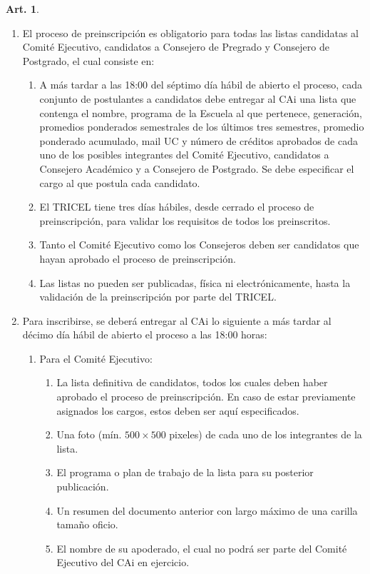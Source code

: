 \documentclass[letterpaper,11pt]{article}
\theoremstyle{definition}%
\newtheorem{art}{Art.} %
\begin{document}
\begin{art}
\begin{enumerate}
		\item El proceso de preinscripción es obligatorio para todas las listas candidatas al Comité Ejecutivo, candidatos a Consejero de Pregrado y Consejero de Postgrado, el cual consiste en:
		      \begin{enumerate}
			      \item A más tardar a las 18:00 del séptimo día hábil de abierto el proceso, cada conjunto
			            de postulantes a candidatos debe entregar al CAi una lista que contenga el nombre, programa de la Escuela al que pertenece, generación, promedios ponderados semestrales de los últimos tres semestres, promedio ponderado acumulado, mail UC y número de créditos aprobados de cada uno de los posibles integrantes del Comité Ejecutivo, candidatos a Consejero Académico y a Consejero de Postgrado. Se debe especificar el cargo al que postula cada candidato.

			      \item El TRICEL tiene tres días hábiles, desde cerrado el proceso de preinscripción, para validar los requisitos de todos los preinscritos.

			      \item Tanto el Comité Ejecutivo como los Consejeros deben ser candidatos que hayan aprobado el proceso de preinscripción.

			      \item Las listas no pueden ser publicadas, física ni electrónicamente, hasta la validación de la preinscripción por parte del TRICEL\@.
		      \end{enumerate}

		\item Para inscribirse, se deberá entregar al CAi lo siguiente a más tardar al décimo día hábil de abierto el proceso a las 18:00 horas:
		      \begin{enumerate}
			      \item Para el Comité Ejecutivo:
			            \begin{enumerate}
				            \item La lista definitiva de candidatos, todos los cuales deben haber aprobado el proceso de preinscripción. En caso de estar previamente asignados los cargos, estos deben ser aquí especificados.
				            \item Una foto (mín. $500 \times 500$ pixeles) de cada uno de los integrantes de la lista.
				            \item El programa o plan de trabajo de la lista para su posterior publicación.
				            \item Un resumen del documento anterior con largo máximo de una carilla tamaño oficio.
				            \item El nombre de su apoderado, el cual no podrá ser parte del Comité Ejecutivo del CAi en ejercicio.
			            \end{enumerate}


\end{enumerate}
\end{enumerate}
\end{art}
\end{document}
